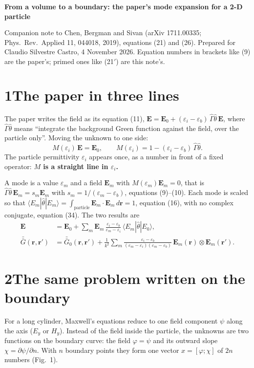 \documentclass[11pt]{article}
\newcommand{\vb}[1]{\boldsymbol{#1}}
\newcommand{\eps}{\varepsilon}
\newcommand{\br}[1]{\langle #1 |}
\newcommand{\kt}[1]{| #1 \rangle}
\begin{document}
{\Large\bfseries From a volume to a boundary: the paper's mode expansion for a 2-D particle}\par
\vspace{2pt}
{\color{muted} Companion note to Chen, Bergman and Sivan (arXiv 1711.00335; Phys.\ Rev.\ Applied 11, 044018, 2019), equations (21) and (26).
Prepared for Claudio Silvestre Castro, 4 November 2026. Equation numbers in brackets like (9) are the paper's; primed ones like (21$'$) are this note's.}

\section*{1\quad The paper in three lines}

The paper writes the field as its equation (11), $\vb E = \vb E_0 + (\eps_i-\eps_b)\,\hat\Gamma\hat\theta\,\vb E$, where $\hat\Gamma\hat\theta$ means ``integrate the background Green function against the field, over the particle only''. Moving the unknown to one side:
\begin{equation}
M(\eps_i)\,\vb E=\vb E_0,\qquad M(\eps_i)=1-(\eps_i-\eps_b)\,\hat\Gamma\hat\theta .
\tag{A}
\end{equation}
The particle permittivity $\eps_i$ appears once, as a number in front of a fixed operator: \textbf{$M$ is a straight line in $\eps_i$.}

A mode is a value $\eps_m$ and a field $\vb E_m$ with $M(\eps_m)\vb E_m=0$, that is $\hat\Gamma\hat\theta\,\vb E_m=s_m\vb E_m$ with $s_m=1/(\eps_m-\eps_b)$, equations (9)--(10). Each mode is scaled so that $\br{E_m}\hat\theta\kt{E_m}=\int_{\text{particle}}\vb E_m\cdot\vb E_m\,d\vb r=1$, equation (16), with no complex conjugate, equation (34). The two results are
\begin{align*}
\vb E &= \vb E_0+\sum_m \vb E_m\,\frac{\eps_i-\eps_b}{\eps_m-\eps_i}\,\br{E_m}\hat\theta\kt{E_0}, \tag{21}\\
\bar{\bar G}(\vb r,\vb r') &= \bar{\bar G}_0(\vb r,\vb r')+\frac1{k^2}\sum_m \frac{\eps_i-\eps_b}{(\eps_m-\eps_i)(\eps_m-\eps_b)}\,\vb E_m(\vb r)\otimes\vb E_m(\vb r'). \tag{26}
\end{align*}

\section*{2\quad The same problem written on the boundary}

For a long cylinder, Maxwell's equations reduce to one field component $\psi$ along the axis ($E_y$ or $H_y$). Instead of the field inside the particle, the unknowns are two functions on the boundary curve: the field $\varphi=\psi$ and its outward slope $\chi=\partial\psi/\partial n$. With $n$ boundary points they form one vector $x=[\varphi;\chi]$ of $2n$ numbers (Fig.~1).
\end{document}
